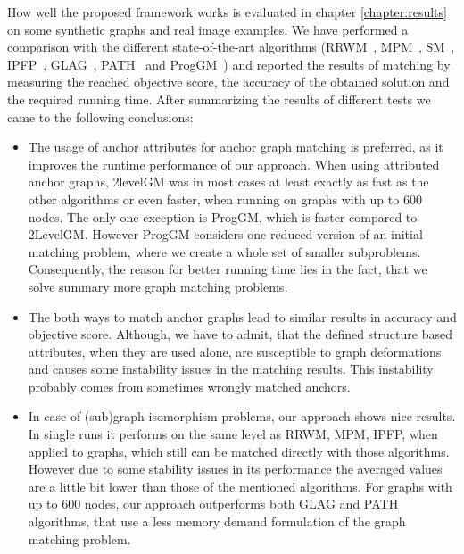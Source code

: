 How well the proposed framework works is evaluated in chapter \ref{chapter:results} on some synthetic graphs and real image examples. We have performed a comparison with the different state-of-the-art algorithms (RRWM~\cite{Cho2010_RRWM}, MPM~\cite{Cho2014_Haystack}, SM~\cite{Leordeanu2005_SM}, IPFP~\cite{Leordeanu2009_IPFP}, GLAG~\cite{Fiori2013_GLAG}, PATH~\cite{Zazlavskiy2008_PATH} and ProgGM~\cite{Cho2012_ProgressiveGM}) and reported the results of matching by measuring the reached objective score, the accuracy of the obtained solution and the required running time. After summarizing the results of different tests we came to the following conclusions:
\begin{itemize}
\item The usage of anchor attributes for anchor graph matching is preferred, as it improves the runtime performance of our approach. 
When using attributed anchor graphs, 2levelGM was in most cases at least exactly as fast as the other algorithms or even faster, when running on graphs with up to $600$ nodes. The only one exception is ProgGM, which is faster compared to 2LevelGM. However ProgGM considers one reduced version of an initial matching problem, where we create a whole set of smaller subproblems. Consequently, the reason for better running time lies in the fact, that we solve summary more graph matching problems.
\item The both ways to match anchor graphs lead to similar results in accuracy and objective score. Although, we have to admit, that the defined structure based attributes, when they are used alone, are susceptible to graph deformations and causes some instability issues in the matching results. This instability probably comes from sometimes wrongly matched anchors.
\item In case of (sub)graph isomorphism problems, our approach shows nice results. In single runs it performs on the same level as RRWM, MPM, IPFP, when applied to graphs, which still can be matched directly with those algorithms. However due to some stability issues in its performance the averaged values are a little bit lower than those of the mentioned algorithms. For graphs with up to $600$ nodes, our approach outperforms both GLAG and PATH algorithms, that use a less memory demand formulation of the graph matching problem.

\end{itemize}
